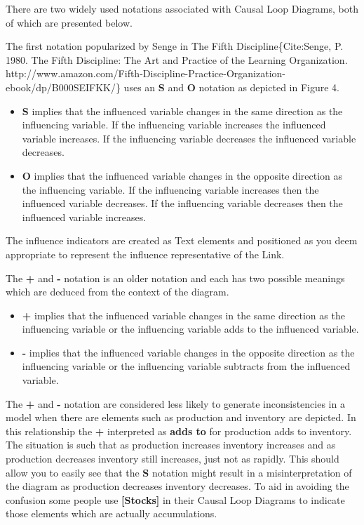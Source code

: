 \documentclass[]{memoir}
\newcommand{\p}[1]{\textbf{{[}#1{]}}}
\begin{document}
There are two widely used notations associated with Causal Loop
Diagrams, both of which are presented below.

The first notation popularized by Senge in The Fifth
Discipline\{Cite:Senge, P. 1980. The Fifth Discipline: The Art and
Practice of the Learning Organization.
http://www.amazon.com/Fifth-Discipline-Practice-Organization-ebook/dp/B000SEIFKK/\}
uses an \textbf{S} and \textbf{O} notation as depicted in Figure 4.

\begin{itemize}
\itemsep1pt\parskip0pt
\item
  \textbf{S} implies that the influenced variable changes in the same
  direction as the influencing variable. If the influencing variable
  increases the influenced variable increases. If the influencing
  variable decreases the influenced variable decreases.
\item
  \textbf{O} implies that the influenced variable changes in the
  opposite direction as the influencing variable. If the influencing
  variable increases then the influenced variable decreases. If the
  influencing variable decreases then the influenced variable increases.
\end{itemize}

The influence indicators are created as Text elements and positioned as
you deem appropriate to represent the influence representative of the
Link.

The \textbf{+} and \textbf{-} notation is an older notation and each has
two possible meanings which are deduced from the context of the diagram.

\begin{itemize}
\itemsep1pt\parskip0pt
\item
  \textbf{+} implies that the influenced variable changes in the same
  direction as the influencing variable or the influencing variable adds
  to the influenced variable.
\item
  \textbf{-} implies that the influenced variable changes in the
  opposite direction as the influencing variable or the influencing
  variable subtracts from the influenced variable.
\end{itemize}

The \textbf{+} and \textbf{-} notation are considered less likely to
generate inconsistencies in a model when there are elements such as
production and inventory are depicted. In this relationship the
\textbf{+} interpreted as \textbf{adds to} for production adds to
inventory. The situation is such that as production increases inventory
increases and as production decreases inventory still increases, just
not as rapidly. This should allow you to easily see that the \textbf{S}
notation might result in a misinterpretation of the diagram as
production decreases inventory decreases. To aid in avoiding the
confusion some people use \p{Stocks} in their Causal Loop Diagrams to
indicate those elements which are actually accumulations.
\end{document}
